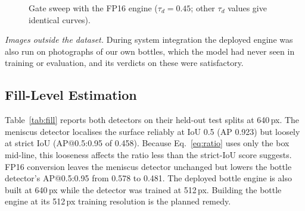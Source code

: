 \documentclass[conference]{IEEEtran}
\begin{document}
\begin{figure}[t]
\centering
{}
\caption{Gate sweep with the FP16 engine ($\tau_d{=}0.45$; other $\tau_d$ values give identical curves).}
\label{fig:sweep}
\end{figure}

\textit{Images outside the dataset.} During system integration the deployed engine was also run on photographs of our own bottles, which the model had never seen in training or evaluation, and its verdicts on these were satisfactory.

\subsection{Fill-Level Estimation}
Table~\ref{tab:fill} reports both detectors on their held-out test splits at 640\,px. The meniscus detector localises the surface reliably at IoU 0.5 (AP 0.923) but loosely at strict IoU (AP@0.5:0.95 of 0.458). Because Eq.~\eqref{eq:ratio} uses only the box mid-line, this looseness affects the ratio less than the strict-IoU score suggests. FP16 conversion leaves the meniscus detector unchanged but lowers the bottle detector's AP@0.5:0.95 from 0.578 to 0.481. The deployed bottle engine is also built at 640\,px while the detector was trained at 512\,px. Building the bottle engine at its 512\,px training resolution is the planned remedy.
\end{document}

